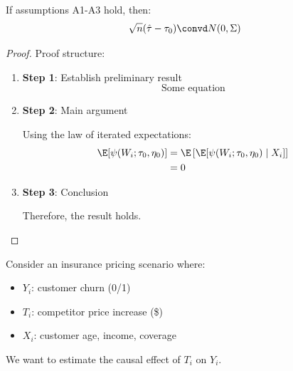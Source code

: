 

\begin{theorem}
\label{thm:main_result}
If assumptions A1-A3 hold, then:
\[
\sqrt{n}(\hat{\tau} - \tau_0) \convd N(0, \Sigma)
\]
\end{theorem}

\begin{proof}
Proof structure:
\begin{enumerate}
    \item \textbf{Step 1}: Establish preliminary result
    \[
    \text{Some equation}
    \]

    \item \textbf{Step 2}: Main argument

    Using the law of iterated expectations:
    \begin{align}
        \E[\psi(W_i; \tau_0, \eta_0)]
        &= \E\left[\E[\psi(W_i; \tau_0, \eta_0) \mid X_i]\right] \\
        &= 0
    \end{align}

    \item \textbf{Step 3}: Conclusion

    Therefore, the result holds.
\end{enumerate}
\end{proof}


\begin{example}
\label{ex:motivation}
Consider an insurance pricing scenario where:
\begin{itemize}
    \item $Y_i$: customer churn (0/1)
    \item $T_i$: competitor price increase (\$)
    \item $X_i$: customer age, income, coverage
\end{itemize}

We want to estimate the causal effect of $T_i$ on $Y_i$.
\end{example}


